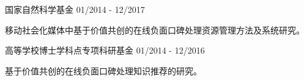 
\begin{cventries}

\cvexperience
{国家自然科学基金}
{01/2014 - 12/2017}
{
    \begin{cvitems}
    \item {移动社会化媒体中基于价值共创的在线负面口碑处理资源管理方法及系统研究。}
    \end{cvitems}
}

\cvexperience
{高等学校博士学科点专项科研基金}
{01/2014 - 12/2016}
{
    \begin{cvitems}
    \item {基于价值共创的在线负面口碑处理知识推荐的研究。}
    \end{cvitems}
}

\end{cventries}